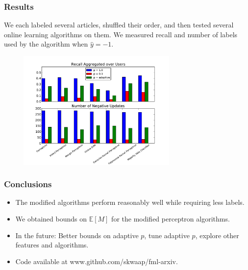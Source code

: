 \documentclass{beamer}
\begin{document}
\begin{frame}
\frametitle{Results}
We each labeled several articles, shuffled their order, and then
tested several online learning algorithms on them.  We measured recall
and number of labels used by the algorithm when $\hat{y} = -1$.
\begin{figure}
\centering
\includegraphics[width=0.7\textwidth]{EveryoneRecallPaper.pdf}
\end{figure}
\end{frame}


\begin{frame}
\frametitle{Conclusions}
\begin{itemize}
\item The modified algorithms perform reasonably well while requiring less labels.
\item We obtained bounds on  $\mathbb{E}[M]$ for the modified perceptron algorithms.
\item In the future: Better bounds on adaptive $p$, tune adaptive $p$, explore other features and algorithms.
\item Code available at www.github.com/skwaap/fml-arxiv.
\end{itemize}
\end{frame}
\end{document}
